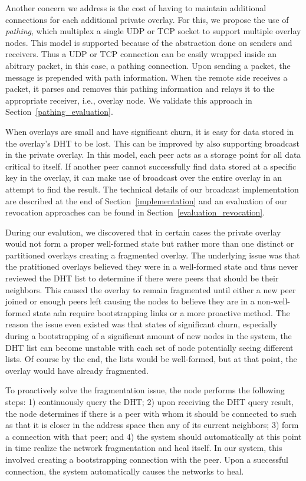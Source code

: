 \documentclass[conference]{IEEEtran}
\begin{document}
Another concern we address is the cost of having to maintain additional
connections for each additional private overlay.  For this, we propose the use of
{\em pathing}, which multiplex a single UDP or TCP socket to support multiple
overlay nodes.  This model is supported because of the abstraction done on
senders and receivers.  Thus a UDP or TCP connection can be easily wrapped 
inside an abitrary packet, in this case, a pathing connection.  Upon sending
a packet, the message is prepended with path information.  When the remote side
receives a packet, it parses and removes this pathing information and relays it
to the appropriate receiver, i.e., overlay node.  We validate this approach in
Section~\ref{pathing_evaluation}.

When overlays are small and have significant churn, it is easy for data stored
in the overlay's DHT to be lost.  This can be improved by also supporting
broadcast in the private overlay.  In this model, each peer acts as a
storage point for all data critical to itself.  If another peer cannot
successfully find data stored at a specific key in the overlay, it can make
use of broadcast over the entire overlay in an attempt to find
the result.  The technical details of our broadcast implementation are described
at the end of Section~\ref{implementation} and an evaluation of our revocation
approaches can be found in Section~\ref{evaluation_revocation}.

During our evalution, we discovered that in certain cases the private overlay
would not form a proper well-formed state but rather more than one distinct or
partitioned overlays creating a fragmented overlay.  The underlying issue was that the
pratitioned overlays believed they were in a well-formed state and thus never
reviewed the DHT list to determine if there were peers that should be their
neighbors.  This caused the overlay to remain fragmented until either a new
peer joined or enough peers left causing the nodes to believe they are in a
non-well-formed state adn require bootstrapping links or a more proactive 
method.  The reason the issue even existed was that states of significant churn,
especially during a bootstrapping of a significant amount of new nodes in the
system, the DHT list can become unstable with each set of node potentially
seeing different lists.  Of course by the end, the lists would be well-formed,
but at that point, the overlay would have already fragmented.

To proactively solve the fragmentation issue, the node performs the following
steps: 1) continuously query the DHT;  2) upon receiving the DHT query result,
the node determines if there is a peer with whom it should be connected to
such as that it is closer in the address space then any of its current neighbors;
3) form a connection with that peer; and 4) the system should automatically at
this point in time realize the network fragmentation and heal itself.  In our
system, this involved creating a bootstrapping connection with the peer.  Upon
a successful connection, the system automatically causes the networks to heal.
\end{document}
